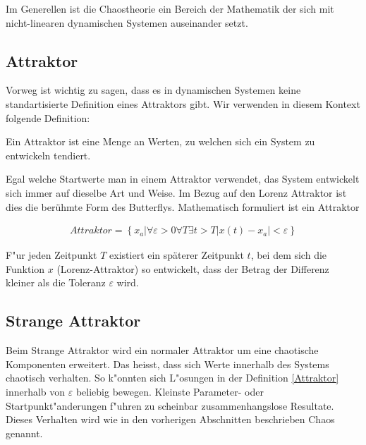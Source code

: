 Im Generellen ist die Chaostheorie ein Bereich der Mathematik der sich mit nicht-linearen dynamischen Systemen auseinander setzt.


\subsection{Attraktor}

Vorweg ist wichtig zu sagen, dass es in dynamischen Systemen keine standartisierte Definition eines Attraktors gibt. Wir verwenden in diesem Kontext folgende Definition: 
\begin{center}
	Ein Attraktor ist eine Menge an Werten, zu welchen sich ein System zu entwickeln tendiert.
\end{center} Egal welche Startwerte man in einem Attraktor verwendet, das System entwickelt sich immer auf dieselbe Art und Weise. Im Bezug auf den Lorenz Attraktor ist dies die berühmte Form des Butterflys. Mathematisch formuliert ist ein Attraktor 

\begin{align}%
\label{Attraktor}Attraktor = \left\{ x_a | \forall \varepsilon > 0
\forall T \exists t > T
|x(t) - x_a| < \varepsilon \right\} 
\end{align}

F"ur jeden Zeitpunkt $T$ existiert ein späterer Zeitpunkt $t$, bei dem sich die Funktion $x$ (Lorenz-Attraktor) so entwickelt, dass der Betrag der Differenz kleiner als die Toleranz $\varepsilon$ wird.

\subsection{Strange Attraktor}
Beim Strange Attraktor wird ein normaler Attraktor um eine chaotische Komponenten erweitert. Das heisst, dass sich Werte innerhalb des Systems chaotisch verhalten. So k"onnten sich L"osungen in der Definition \eqref{Attraktor} innerhalb von $\varepsilon$ beliebig bewegen. Kleinste Parameter- oder Startpunkt"anderungen f"uhren zu scheinbar zusammenhangslose Resultate. Dieses Verhalten wird wie in den vorherigen Abschnitten beschrieben Chaos genannt.

